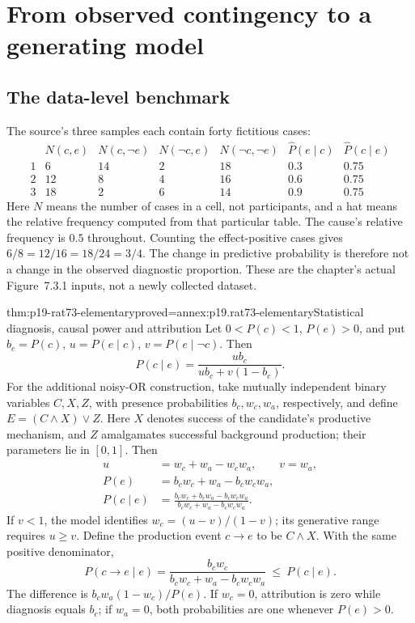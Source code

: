\section{From observed contingency to a generating model}
\label{sec:p19-rat73-elementary}

\subsection{The data-level benchmark}

The source's three samples each contain forty fictitious cases:
\[
\begin{array}{c|rrrr|cc}
 &N(c,e)&N(c,\neg e)&N(\neg c,e)&N(\neg c,\neg e)
 &\widehat P(e\mid c)&\widehat P(c\mid e)\\\hline
 1&6&14&2&18&0.3&0.75\\
 2&12&8&4&16&0.6&0.75\\
 3&18&2&6&14&0.9&0.75
\end{array}
\]
Here \(N\) means the number of cases in a cell, not participants, and a
hat means the relative frequency computed from that particular table.
The cause's relative frequency is \(0.5\) throughout. Counting the
effect-positive cases gives \(6/8=12/16=18/24=3/4\).
The change in predictive probability is therefore not a change in the
observed diagnostic proportion. These are the chapter's actual
Figure~7.3.1 inputs, not a newly collected dataset.
\cite[fig.~7.3.1 and eq.~(1), p.~450]{MederMayrhofer2021DiagnosticCausal}

\begin{hbtheorem}{thm:p19-rat73-elementary}{proved=annex:p19.rat73-elementary}{Statistical diagnosis, causal power and attribution}
Let \(0<P(c)<1\), \(P(e)>0\), and put
\(b_c=P(c)\), \(u=P(e\mid c)\), \(v=P(e\mid\neg c)\).
Then
\[
 P(c\mid e)=\frac{u b_c}{u b_c+v(1-b_c)}.
\]
For the additional noisy-OR construction, take mutually independent
binary variables \(C,X,Z\), with presence probabilities
\(b_c,w_c,w_a\), respectively, and define
\(E=(C\land X)\lor Z\). Here \(X\) denotes success of the candidate's
productive mechanism, and \(Z\) amalgamates successful background
production; their parameters lie in \([0,1]\).
Then
\[
\begin{split}
 u&=w_c+w_a-w_cw_a,\qquad v=w_a,\\
 P(e)&=b_cw_c+w_a-b_cw_cw_a,\\
 P(c\mid e)&=
 \frac{b_cw_c+b_cw_a-b_cw_cw_a}
      {b_cw_c+w_a-b_cw_cw_a}.
\end{split}
\]
If \(v<1\), the model identifies
\(w_c=(u-v)/(1-v)\); its generative range requires \(u\geq v\).
Define the production event \(c\to e\) to be \(C\land X\).
With the same positive denominator,
\[
 P(c\to e\mid e)=
 \frac{b_cw_c}{b_cw_c+w_a-b_cw_cw_a}
 \ \leq\ P(c\mid e).
\]
The difference is
\(b_cw_a(1-w_c)/P(e)\). If \(w_c=0\), attribution is zero
while diagnosis equals \(b_c\); if \(w_a=0\), both probabilities
are one whenever \(P(e)>0\).
\end{hbtheorem}

